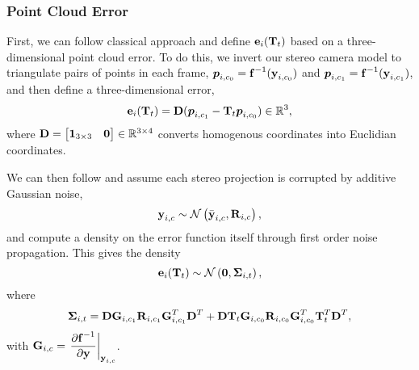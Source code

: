 \subsubsection{Point Cloud Error}
\label{sec:vo_point_cloud}
First, we can follow classical approach \citep{Maimone2007-tc} and define $ \boldsymbol{\mathbf{e}}_{i}(\boldsymbol{\mathbf{T}}_t) $ based on a three-dimensional point cloud error. To do this, we invert our stereo camera model to triangulate pairs of points in each frame, $\boldsymbol{p}_{i,c_0} = \boldsymbol{\mathbf{f}}^{-1}(\boldsymbol{\mathbf{y}}_{i, c_0})$ and $\boldsymbol{p}_{i,c_1} = \boldsymbol{\mathbf{f}}^{-1}(\boldsymbol{\mathbf{y}}_{i, c_1})$, and then define a three-dimensional error,
\begin{align}
	 \boldsymbol{\mathbf{e}}_{i}(\boldsymbol{\mathbf{T}}_t) = \boldsymbol{\mathbf{D}}(\boldsymbol{p}_{i,c_1} - \boldsymbol{\mathbf{T}}_t \boldsymbol{p}_{i,c_0}) \in \mathbb{R}{}^3,
\end{align}
where $\boldsymbol{\mathbf{D}} = \begin{bmatrix} \boldsymbol{\mathbf{1}}_{3\times3} & \boldsymbol{\mathbf{0}} \end{bmatrix} \in \mathbb{R}{}^{3\times4}$ converts homogenous coordinates into Euclidian coordinates.

\noindent We can then follow \cite{Maimone2007-tc} and assume each stereo projection is corrupted by additive Gaussian noise,
\begin{equation}
\boldsymbol{\mathbf{y}}_{i, c} \sim \mathcal{N}\left(\bar{\boldsymbol{\mathbf{y}}}_{i,c}, \boldsymbol{\mathbf{R}}_{i,c} \right), 
\end{equation}  
and compute a density on the error function itself through first order noise propagation. This gives the density
 \begin{equation}
  \boldsymbol{\mathbf{e}}_{i}(\boldsymbol{\mathbf{T}}_t) \sim
 \mathcal{N}\left(\boldsymbol{\mathbf{0}}, \boldsymbol{\mathbf{\Sigma}}_{i,t} \right), 
\end{equation}
where
\begin{equation}
	\boldsymbol{\mathbf{\Sigma}}_{i,t} = \boldsymbol{\mathbf{D}}\boldsymbol{\mathbf{G}}_{i,c_1} \boldsymbol{\mathbf{R}}_{i,c_1}  \boldsymbol{\mathbf{G}}_{i,c_1}^T \boldsymbol{\mathbf{D}}^T + 
 \boldsymbol{\mathbf{D}}\boldsymbol{\mathbf{T}}_t \boldsymbol{\mathbf{G}}_{i,c_0}  \boldsymbol{\mathbf{R}}_{i,c_0} \boldsymbol{\mathbf{G}}_{i,c_0}^T  \boldsymbol{\mathbf{T}}_t^T \boldsymbol{\mathbf{D}}^T,
\end{equation}
with
$\boldsymbol{\mathbf{G}}_{i,c} = \left.\dfrac{\partial \boldsymbol{\mathbf{f}}^{-1}}{\partial \boldsymbol{\mathbf{y}}}\right|_{\boldsymbol{\mathbf{y}}_{i, c}}$.

